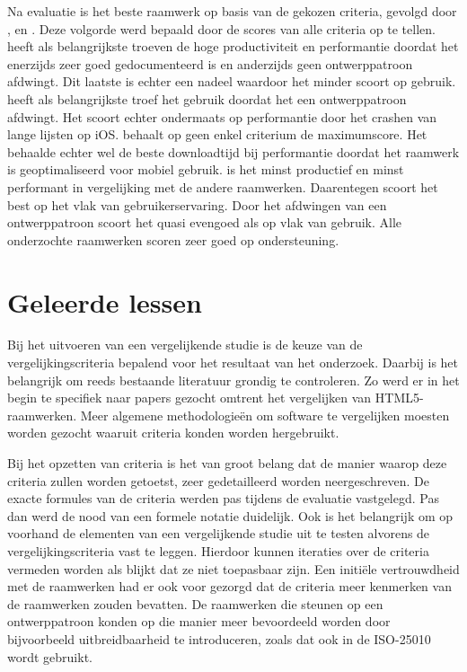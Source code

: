 Na evaluatie is \jqm{} het beste raamwerk op basis van de gekozen criteria, gevolgd door \kendo{}, \lungo{} en \st{}.
Deze volgorde werd bepaald door de scores van alle criteria op te tellen.
\jqm{} heeft als belangrijkste troeven de hoge productiviteit en performantie doordat het enerzijds zeer goed gedocumenteerd is en anderzijds geen ontwerppatroon afdwingt.
Dit laatste is echter een nadeel waardoor het minder scoort op gebruik.
\kendo{} heeft als belangrijkste troef het gebruik doordat het een ontwerppatroon afdwingt.
Het scoort echter ondermaats op performantie door het crashen van lange lijsten op iOS.
\lungo{} behaalt op geen enkel criterium de maximumscore.
Het behaalde echter wel de beste downloadtijd bij performantie doordat het raamwerk is geoptimaliseerd voor mobiel gebruik.
\st{} is het minst productief en minst performant in vergelijking met de andere raamwerken.
Daarentegen scoort \st{} het best op het vlak van gebruikerservaring.
Door het afdwingen van een ontwerppatroon scoort het quasi evengoed als \kendo{} op vlak van gebruik.
Alle onderzochte raamwerken scoren zeer goed op ondersteuning.


\section{Geleerde lessen} %
Bij het uitvoeren van een vergelijkende studie is de keuze van de vergelijkingscriteria bepalend voor het resultaat van het onderzoek.
Daarbij is het belangrijk om reeds bestaande literatuur grondig te controleren.
Zo werd er in het begin te specifiek naar papers gezocht omtrent het vergelijken van HTML5-raamwerken.
Meer algemene methodologieën om software te vergelijken moesten worden gezocht waaruit criteria konden worden hergebruikt.

Bij het opzetten van criteria is het van groot belang dat de manier waarop deze criteria zullen worden getoetst, zeer gedetailleerd worden neergeschreven.
De exacte formules van de criteria werden pas tijdens de evaluatie vastgelegd.
Pas dan werd de nood van een formele notatie duidelijk.
Ook is het belangrijk om op voorhand de elementen van een vergelijkende studie uit te testen alvorens de vergelijkingscriteria vast te leggen.
Hierdoor kunnen iteraties over de criteria vermeden worden als blijkt dat ze niet toepasbaar zijn.
Een initiële vertrouwdheid met de raamwerken had er ook voor gezorgd dat de criteria meer kenmerken van de raamwerken zouden bevatten.
De raamwerken die steunen op een ontwerppatroon konden op die manier meer bevoordeeld worden door bijvoorbeeld uitbreidbaarheid te introduceren, zoals dat ook in de ISO-25010 wordt gebruikt.


